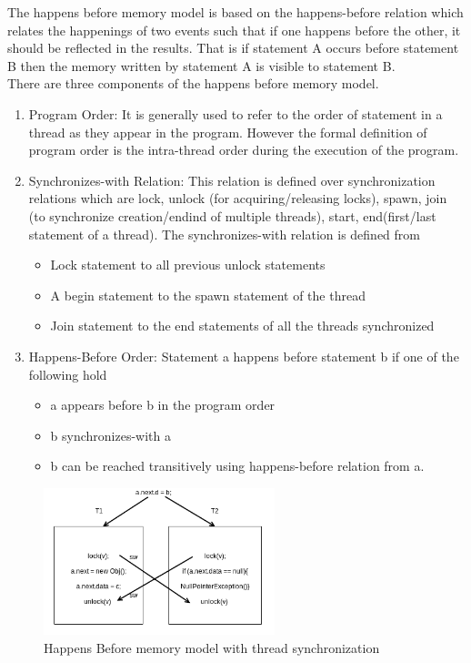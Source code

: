 The happens before memory model is based on the happens-before relation which relates the happenings of two events such that if one happens before the other, it should be reflected in the results. That is if statement A occurs before statement B then the memory written by statement A is visible to statement B. \\
There are three components of the happens before memory model.
\begin{enumerate}
	\item Program Order: It is generally used to refer to the order of statement in a thread as they appear in the program. However the formal definition of program order is the intra-thread order during the execution of the program.
	\item Synchronizes-with Relation: This relation is defined over synchronization relations which are lock, unlock (for acquiring/releasing locks), spawn, join (to synchronize creation/endind of multiple threads), start, end(first/last statement of a thread). The synchronizes-with relation is defined from
	\begin{itemize}
		\item Lock statement to all previous unlock statements
		\item A begin statement to the spawn statement of the thread
		\item Join statement to the end statements of all the threads synchronized
	\end{itemize} 
	\item Happens-Before Order: Statement  a happens before statement b if one of the following hold
	\begin{itemize}
		\item a appears before b in the program order
		\item b synchronizes-with a
		\item b can be reached transitively using happens-before relation from a.
	\end{itemize}   
\end{enumerate}
 
\begin{figure}
	\centering
	\includegraphics[width=0.6\textwidth]{Figures/sync_threads.png}
	\caption{Happens Before memory model with thread synchronization}
	\label{fig:happensbefore1}
\end{figure}


